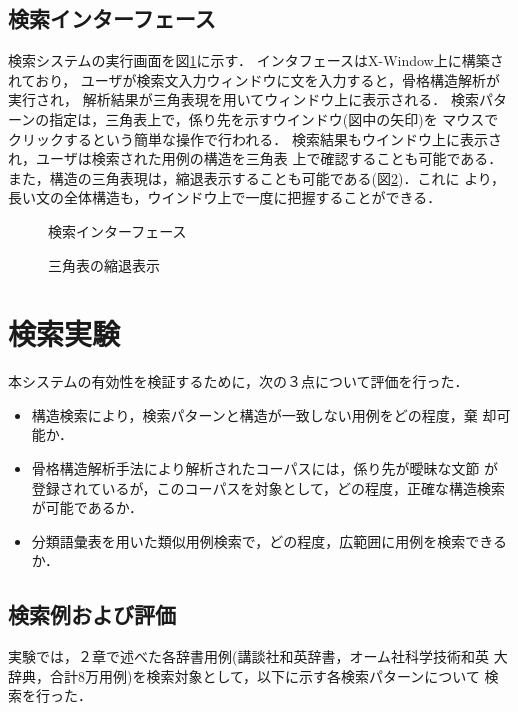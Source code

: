 \subsection{検索インターフェース}
検索システムの実行画面を図\ref{interface}に示す．
インタフェースはX-Window上に構築されており，
ユーザが検索文入力ウィンドウに文を入力すると，骨格構造解析が実行され，
解析結果が三角表現を用いてウィンドウ上に表示される．
検索パターンの指定は，三角表上で，係り先を示すウインドウ(図中の矢印)を
マウスでクリックするという簡単な操作で行われる．
検索結果もウインドウ上に表示され，ユーザは検索された用例の構造を三角表
上で確認することも可能である．
また，構造の三角表現は，縮退表示することも可能である(図\ref{reduce})．これに
より，長い文の全体構造も，ウインドウ上で一度に把握することができる．

\begin{figure}[htb]
\begin{center}
\vspace{-5mm}
  
\caption{検索インターフェース}
\label{interface}
\end{center}
\end{figure}


\begin{figure}[htb]
\begin{center}
\vspace{-10mm}
  
\caption{三角表の縮退表示}
\vspace{-5mm}
\label{reduce}
\end{center}
\end{figure}


\section{検索実験}
本システムの有効性を検証するために，次の３点について評価を行った．
\begin{itemize}
\item 構造検索により，検索パターンと構造が一致しない用例をどの程度，棄
却可能か．
\item 骨格構造解析手法により解析されたコーパスには，係り先が曖昧な文節
が登録されているが，このコーパスを対象として，どの程度，正確な構造検索
が可能であるか．
\item 分類語彙表を用いた類似用例検索で，どの程度，広範囲に用例を検索できるか．
\end{itemize}


\subsection{検索例および評価}
実験では，２章で述べた各辞書用例(講談社和英辞書，オーム社科学技術和英
大辞典，合計8万用例)を検索対象として，以下に示す各検索パターンについて
検索を行った．

